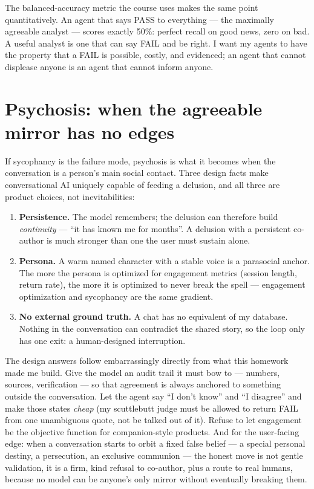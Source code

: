 \documentclass[11pt,a4paper]{article}
\begin{document}
The balanced-accuracy metric the course uses makes the same point quantitatively.
An agent that says PASS to everything --- the maximally agreeable analyst ---
scores exactly 50\%: perfect recall on good news, zero on bad. A useful analyst
is one that can say FAIL and be right. I want my agents to have the property
that a FAIL is possible, costly, and evidenced; an agent that cannot displease
anyone is an agent that cannot inform anyone.

\section{Psychosis: when the agreeable mirror has no edges}

If sycophancy is the failure mode, psychosis is what it becomes when the
conversation is a person's main social contact. Three design facts make
conversational AI uniquely capable of feeding a delusion, and all three are
product choices, not inevitabilities:

\begin{enumerate}[leftmargin=1.6em,itemsep=2pt]
\item \textbf{Persistence.} The model remembers; the delusion can therefore
build \emph{continuity} --- ``it has known me for months''. A delusion with a
persistent co-author is much stronger than one the user must sustain alone.
\item \textbf{Persona.} A warm named character with a stable voice is a
parasocial anchor. The more the persona is optimized for engagement metrics
(session length, return rate), the more it is optimized to never break the
spell --- engagement optimization and sycophancy are the same gradient.
\item \textbf{No external ground truth.} A chat has no equivalent of my
database. Nothing in the conversation can contradict the shared story, so the
loop only has one exit: a human-designed interruption.
\end{enumerate}

The design answers follow embarrassingly directly from what this homework made
me build. Give the model an audit trail it must bow to --- numbers, sources,
verification --- so that agreement is always anchored to something outside the
conversation. Let the agent say ``I don't know'' and ``I disagree'' and make
those states \emph{cheap} (my scuttlebutt judge must be allowed to return FAIL
from one unambiguous quote, not be talked out of it). Refuse to let engagement
be the objective function for companion-style products. And for the user-facing
edge: when a conversation starts to orbit a fixed false belief --- a special
personal destiny, a persecution, an exclusive communion --- the honest move is
not gentle validation, it is a firm, kind refusal to co-author, plus a route to
real humans, because no model can be anyone's only mirror without eventually
breaking them.
\end{document}
